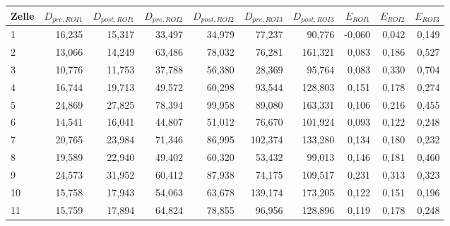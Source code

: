 \begin{center}
    \centering
    \begin{tabular}{lrrrrrrrrr}
        \toprule
        Zelle &   $D_{pre,ROI1}$ &  $D_{post,ROI1}$ &   $D_{pre,ROI2}$ &  $D_{post,ROI2}$ &    $D_{pre,ROI3}$ &   $D_{post,ROI3}$ &     $E_{ROI1}$ &    $E_{ROI2}$ &    $E_{ROI3}$ \\
        \midrule
        1  & 16,235 & 15,317 & 33,497 & 34,979 &  77,237 &  90,776 & -0,060 & 0,042 & 0,149 \\
        2  & 13,066 & 14,249 & 63,486 & 78,032 &  76,281 & 161,321 &  0,083 & 0,186 & 0,527 \\
        3  & 10,776 & 11,753 & 37,788 & 56,380 &  28,369 &  95,764 &  0,083 & 0,330 & 0,704 \\
        4  & 16,744 & 19,713 & 49,572 & 60,298 &  93,544 & 128,803 &  0,151 & 0,178 & 0,274 \\
        5  & 24,869 & 27,825 & 78,394 & 99,958 &  89,080 & 163,331 &  0,106 & 0,216 & 0,455 \\
        6 & 14,541 & 16,041 & 44,807 & 51,012 &  76,670 & 101,924 &  0,093 & 0,122 & 0,248 \\
        7 & 20,765 & 23,984 & 71,346 & 86,995 & 102,374 & 133,280 &  0,134 & 0,180 & 0,232 \\
        8 & 19,589 & 22,940 & 49,402 & 60,320 &  53,432 &  99,013 &  0,146 & 0,181 & 0,460 \\
        9 & 24,573 & 31,952 & 60,412 & 87,938 &  74,175 & 109,517 &  0,231 & 0,313 & 0,323 \\
        10 & 15,758 & 17,943 & 54,063 & 63,678 & 139,174 & 173,205 &  0,122 & 0,151 & 0,196 \\
        11 & 15,759 & 17,894 & 64,824 & 78,855 &  96,956 & 128,896 &  0,119 & 0,178 & 0,248 \\
        \bottomrule
    \end{tabular}
    \label{tab:bleach}
\end{center}


